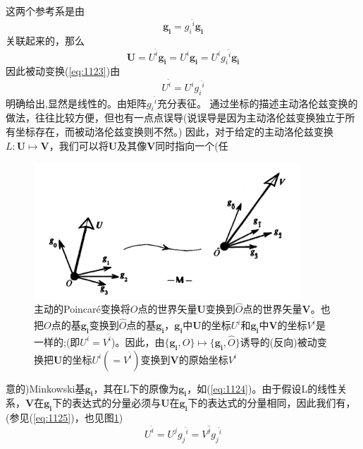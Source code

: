 \documentclass[utf8]{ctexbook}
\numberwithin{equation}{section}
\begin{document}
这两个参考系是由
\begin{equation}
    \mathbf{g_i}={g_{i}{}^{\hat{i}}}\mathbf{g_{\hat{i}}}\label{eq:1124}
\end{equation}
关联起来的，那么
\begin{equation}
    \mathbf{U}=U^{\hat{i}}\mathbf{g_{\hat{i}}}=U^{i}\mathbf{g_i}=U^i g_{i}{}^{\hat{i}}\mathbf{g_{\hat{i}}}
\end{equation}
因此被动变换(\ref{eq:1123})由
\begin{equation}
    U^{\hat{i}}=U^i g_{i}{}^{\hat{i}}\label{eq:1125}
\end{equation}
明确给出,显然是线性的。由矩阵$g_{i}{}^{\hat{i}}$充分表征。
通过坐标的描述主动洛伦兹变换的做法，往往比较方便，但也有一点点误导(说误导是因为主动洛伦兹变换独立于所有坐标存在，而被动洛伦兹变换则不然。)
因此，对于给定的主动洛伦兹变换$L:\mathbf{U}\mapsto \mathbf{V}$，我们可以将$\mathbf{U}$及其像$\mathbf{V}$同时指向一个(任
\begin{figure}
    \centering
    \includegraphics[width=10cm]{fg1-1.png}
    \caption{主动的Poincaré变换将$O$点的世界矢量$\mathbf{U}$变换到$\hat{O}$点的世界矢量$\mathbf{V}$。也把$O$点的基$\mathbf{g_i}$变换到$\hat{O}$点的基$\mathbf{g_{\hat{i}}}$，$\mathbf{g_i}$中$\mathbf{U}$的坐标$U^i$和$\mathbf{g_{\hat{i}}}$中$\mathbf{V}$的坐标$V^{\hat{i}}$是一样的;(即$U^i=V^{\hat{i}}$)。因此，由$\{\mathbf{g_i},O\}\mapsto \{\mathbf{g_{\hat{i}}},\hat{O}\}$诱导的(反向)被动变换把$\mathbf{U}$的坐标$U^i(=V^{\hat{i}})$变换到$\mathbf{V}$的原始坐标$V^i$}\label{fig:1-1}
\end{figure}
意的)Minkowski基$\mathbf{g_i}$，其在L下的原像为$\mathbf{g_i}$，如(\ref{eq:1124})。由于假设L的线性关系，$\mathbf{V}$在$\mathbf{g_{\hat{i}}}$下的表达式的分量必须与$\mathbf{U}$在$\mathbf{g_i}$下的表达式的分量相同，因此我们有，(参见(\ref{eq:1125})，也见图\ref{fig:1-1})
\begin{equation}
    U^{\hat{i}}=U^{j}g_{j}{}^{\hat{i}}=V^{\hat{j}}g_{j}{}^{\hat{i}}\label{eq:1126}
\end{equation}
\end{document}

